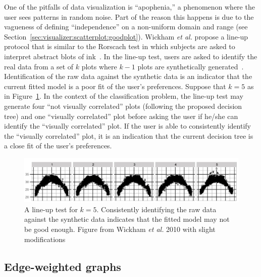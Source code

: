 One of the pitfalls of data visualization is ``apophenia,'' a phenomenon where
the user sees patterns in random noise. Part of the reason this happens is due 
to the vagueness of defining ``independence'' on a non-uniform domain and range
(see Section~\ref{sec:visualizer:scatterplot:goodplot}). Wickham \textit{et 
al.} propose a line-up protocol that is similar to the Rorscach test in which 
subjects are asked to interpret abstract blots of ink~\cite{wickham2010}. 
In the line-up test, users are asked to identify the real data from a set of 
$k$ plots where $k-1$ plots are synthetically generated~\cite{wickham2010}.
Identification of the raw data against the synthetic data is an indicator 
that the current fitted model is a poor fit of the user's preferences. Suppose 
that $k = 5$ as in Figure~\ref{fig:visualizer:lineup}.
In the context of the classification problem, the line-up test may generate
four ``not visually correlated'' plots (following the proposed decision tree) 
and one ``visually correlated'' plot before asking the user if he/she can 
identify the ``visually correlated'' plot. If the user is able to consistently 
identify the ``visually correlated'' plot, it is an indication that the current 
decision tree is a close fit of the user's preferences.

\begin{figure}[H]
	\begin{center}
		\includegraphics[width=1\linewidth]{ch-conclusion/figures/lineup}
		\caption[A line-up test for $k = 5$. ]{A line-up test for $k = 5$.
			Consistently identifying the raw data against the synthetic data 
			indicates that the fitted model may not be good enough. Figure from 
			Wickham \textit{et al.} 2010 with slight 
			modifications~\cite{wickham2010}}
		\label{fig:visualizer:lineup}
	\end{center}
\end{figure}

\subsection{Edge-weighted graphs}
\label{sec:futurework:edgeweighted}

